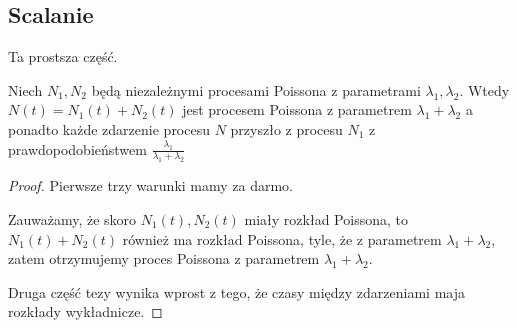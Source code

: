 \subsection{Scalanie}
Ta prostsza część.
\begin{theorem}[Twierdzenie 8.12 P\&C]
	Niech \( N_1, N_2 \) będą niezależnymi procesami Poissona z parametrami \( \lambda_1, \lambda_2 \).
	Wtedy \( N(t) = N_1(t) + N_2(t) \) jest procesem Poissona z parametrem \( \lambda_1 + \lambda_2 \)
	a ponadto każde zdarzenie procesu \( N \) przyszło z procesu \( N_1 \) z prawdopodobieństwem \( \frac{\lambda_1}{\lambda_1 + \lambda_2} \)
\end{theorem}
\begin{proof}
	Pierwsze trzy warunki mamy za darmo.

	Zauważamy, że skoro \( N_1(t), N_2(t) \) miały rozkład Poissona, to \( N_1(t) + N_2(t) \) również ma rozkład Poissona, tyle, że z parametrem \( \lambda_1 + \lambda_2 \), zatem otrzymujemy proces Poissona z parametrem \( \lambda_1 + \lambda_2 \).

	Druga część tezy wynika wprost z tego, że czasy między zdarzeniami maja rozkłady wykładnicze.
\end{proof}

